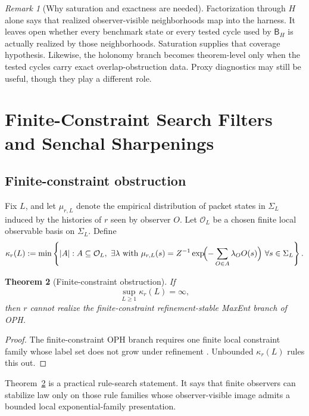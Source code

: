 \documentclass[11pt]{article}
\newtheorem{theorem}{Theorem}[section]
\theoremstyle{remark}
\newtheorem{remark}[theorem]{Remark}
\theoremstyle{plain}
\begin{document}
\begin{remark}[Why saturation and exactness are needed]
Factorization through \(H\) alone says that realized observer-visible neighborhoods map into the harness. It leaves open whether every benchmark state or every tested cycle used by \(\mathsf B_H\) is actually realized by those neighborhoods. Saturation supplies that coverage hypothesis. Likewise, the holonomy branch becomes theorem-level only when the tested cycles carry exact overlap-obstruction data. Proxy diagnostics may still be useful, though they play a different role.
\end{remark}

\section{Finite-Constraint Search Filters and Senchal Sharpenings}
\label{sec:senchal}

\subsection{Finite-constraint obstruction}

Fix \(L\), and let \(\mu_{r,L}\) denote the empirical distribution of packet states in \(\Sigma_L\) induced by the histories of \(r\) seen by observer \(O\). Let \(\mathcal O_L\) be a chosen finite local observable basis on \(\Sigma_L\). Define
\[
\kappa_r(L)
:=
\min\left\{
|A|:
A\subseteq\mathcal O_L,\
\exists \lambda\ \text{with}\
\mu_{r,L}(s)=
Z^{-1}\exp\!\Bigl(-\sum_{O\in A}\lambda_O O(s)\Bigr)
\ \forall s\in\Sigma_L
\right\}.
\]

\begin{theorem}[Finite-constraint obstruction]
\label{thm:maxent}
If
\[
\sup_{L\ge 1}\kappa_r(L)=\infty,
\]
then \(r\) cannot realize the finite-constraint refinement-stable MaxEnt branch of OPH.
\end{theorem}

\begin{proof}
The finite-constraint OPH branch requires one finite local constraint family whose label set does not grow under refinement \cite{ophsynthesis}. Unbounded \(\kappa_r(L)\) rules this out.
\end{proof}

Theorem~\ref{thm:maxent} is a practical rule-search statement. It says that finite observers can stabilize law only on those rule families whose observer-visible image admits a bounded local exponential-family presentation.
\end{document}
